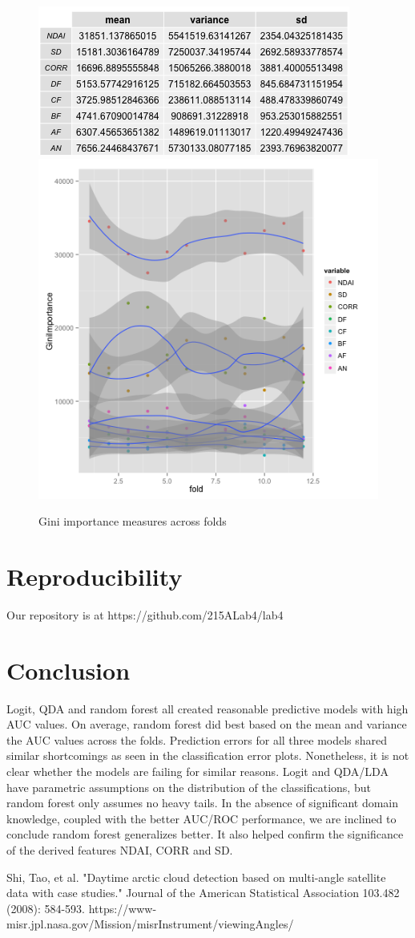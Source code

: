 \documentclass{article}\usepackage[]{graphicx}\usepackage[]{color}
\begin{document}
  \begin{figure}[H]
  \includegraphics[width=\linewidth, height = 140pts ]{Gini_mean_sd.png}
\endminipage\hfill
{}
  \includegraphics[width=\linewidth, height = 180pts]{Gini_importance.png}
\endminipage\hfill
  \caption{Gini importance measures across folds}\label{}
\end{figure}


\section{Reproducibility}

Our repository is at https://github.com/215ALab4/lab4

\section{Conclusion} 
Logit, QDA and random forest all created reasonable predictive models with high AUC values.  On average, random forest did best based on the mean and variance the AUC values across the folds.  Prediction errors for all three models shared similar shortcomings as seen in the classification error plots.  Nonetheless, it is not clear whether the models are failing for similar reasons.  Logit and QDA/LDA have parametric assumptions on the distribution of the classifications, but random forest only assumes no heavy tails.  In the absence of significant domain knowledge, coupled with the better AUC/ROC performance, we are inclined to conclude random forest generalizes better.  It also helped confirm the significance of the derived features NDAI, CORR and SD.  
 \begin{thebibliography}{1}
Shi, Tao, et al. "Daytime arctic cloud detection based on multi-angle satellite data with case studies." Journal of the American Statistical Association 103.482 (2008): 584-593.
https://www-misr.jpl.nasa.gov/Mission/misrInstrument/viewingAngles/
\end{thebibliography}
\end{document}
